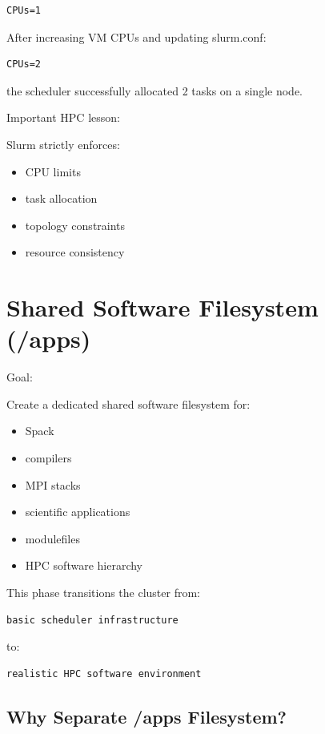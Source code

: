 \documentclass[11pt]{article}
\begin{document}
\begin{verbatim}
CPUs=1
\end{verbatim}

After increasing VM CPUs and updating slurm.conf:

\begin{verbatim}
CPUs=2
\end{verbatim}

the scheduler successfully allocated 2 tasks on a single node.

Important HPC lesson:

Slurm strictly enforces:
\begin{itemize}
\item CPU limits
\item task allocation
\item topology constraints
\item resource consistency
\end{itemize}
\section{Shared Software Filesystem (/apps)}
\label{sec:org1befa66}

Goal:

Create a dedicated shared software filesystem for:

\begin{itemize}
\item Spack
\item compilers
\item MPI stacks
\item scientific applications
\item modulefiles
\item HPC software hierarchy
\end{itemize}

This phase transitions the cluster from:

\begin{verbatim}
basic scheduler infrastructure
\end{verbatim}

to:

\begin{verbatim}
realistic HPC software environment
\end{verbatim}
\subsection{Why Separate /apps Filesystem?}
\label{sec:org8b0e723}
\end{document}

